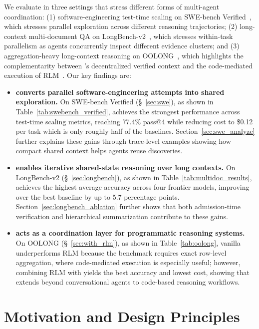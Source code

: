 We evaluate \toolName{} in three settings that stress different forms of multi-agent coordination: (1) software-engineering test-time scaling on SWE-bench Verified~\citep{jimenez2024swebench}, which stresses parallel exploration across different reasoning trajectories; (2) long-context multi-document QA on LongBench-v2~\citep{bai2025longbench}, which stresses within-task parallelism as agents concurrently inspect different evidence clusters; and (3) aggregation-heavy long-context reasoning on OOLONG~\citep{bertsch2025oolong}, which highlights the complementarity between \toolName{}’s decentralized verified context and the code-mediated execution of RLM~\citep{zhang2025recursive}. Our key findings are: 
\begin{itemize}
    \item \textbf{\toolName{} converts parallel software-engineering attempts into shared exploration.} On SWE-bench Verified (\S~\ref{sec:swe}), as shown in Table~\ref{tab:swebench_verified}, \toolName{} achieves the strongest performance across test-time scaling metrics, reaching 77.4\% pass@4 while reducing cost to \$0.12 per task which is only roughly half of the baselines. Section~\ref{sec:swe_analyze} further explains these gains through trace-level examples showing how compact shared context helps agents reuse discoveries.
    \item \textbf{\toolName{} enables iterative shared-state reasoning over long contexts.} On LongBench-v2 (\S~\ref{sec:longbench}), as shown in Table~\ref{tab:multidoc_results}, \toolName{} achieves the highest average accuracy across four frontier models, improving over the best baseline by up to 5.7 percentage points. Section~\ref{sec:longbench_ablation} further shows that both admission-time verification and hierarchical summarization contribute to these gains.
    \item \textbf{\toolName{} acts as a coordination layer for programmatic reasoning systems.} On OOLONG (\S~\ref{sec:with_rlm}), as shown in Table~\ref{tab:oolong}, vanilla \toolName{} underperforms RLM because the benchmark requires exact row-level aggregation, where code-mediated execution is especially useful; however, combining RLM with \toolName{} yields the best accuracy and lowest cost, showing that \toolName{} extends beyond conversational agents to code-based reasoning workflows.
\end{itemize}

\section{Motivation and Design Principles}
\label{sec:motivation}

